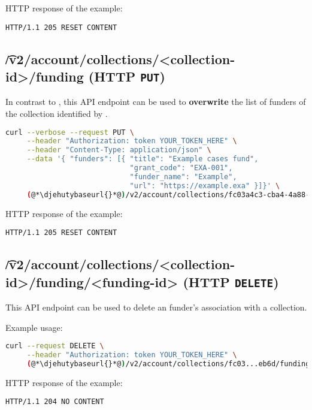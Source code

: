   HTTP response of the example:
\begin{lstlisting}
HTTP/1.1 205 RESET CONTENT
\end{lstlisting}

\subsection{\t{/v2/account/collections/<collection-id>/funding} (HTTP \texttt{PUT})}

  In contrast to , this API endpoint
  can be used to \textbf{overwrite} the list of funders of the collection
  identified by .

\begin{lstlisting}[language=bash]
curl --verbose --request PUT \
     --header "Authorization: token YOUR_TOKEN_HERE" \
     --header "Content-Type: application/json" \
     --data '{ "funders": [{ "title": "Example cases fund",
                             "grant_code": "EXA-001",
                             "funder_name": "Example",
                             "url": "https://example.exa" }]}' \
     (@*\djehutybaseurl{}*@)/v2/account/collections/fc03a4c3-cba4-4a88-a8a6-eb38924eeb6d/funding
\end{lstlisting}

  HTTP response of the example:
\begin{lstlisting}
HTTP/1.1 205 RESET CONTENT
\end{lstlisting}

\subsection{\t{/v2/account/collections/<collection-id>/funding/<funding-id>} (HTTP \texttt{DELETE})}

  This API endpoint can be used to delete an funder's association with a collection.

  Example usage:
\begin{lstlisting}[language=bash]
curl --request DELETE \
     --header "Authorization: token YOUR_TOKEN_HERE" \
     (@*\djehutybaseurl{}*@)/v2/account/collections/fc03...eb6d/funding/9b43...e6cd
\end{lstlisting}

  HTTP response of the example:
\begin{lstlisting}
HTTP/1.1 204 NO CONTENT
\end{lstlisting}

